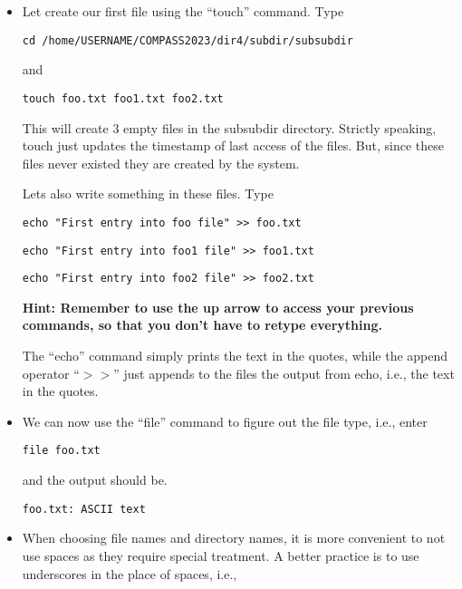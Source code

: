 \documentclass[aps,showpacs,prd,notitlepage,preprintnumbers,amsmath,amssymb,letterpaper]{revtex4}
\begin{document}
\begin{itemize}
\item Let create our first file using the ``touch'' command. Type

\begin{verbatim}
cd /home/USERNAME/COMPASS2023/dir4/subdir/subsubdir
\end{verbatim}

and

\begin{verbatim}
touch foo.txt foo1.txt foo2.txt
\end{verbatim}

This will create 3 empty files in the subsubdir directory. Strictly
speaking, touch just updates the timestamp of last access of the
files.  But, since these files never existed they are created by the
system.

Lets also write something in these files. Type

\begin{verbatim}
echo "First entry into foo file" >> foo.txt
\end{verbatim}

\begin{verbatim}
echo "First entry into foo1 file" >> foo1.txt
\end{verbatim}

\begin{verbatim}
echo "First entry into foo2 file" >> foo2.txt
\end{verbatim}

{\bf Hint: Remember to use the up arrow to access your previous
commands, so that you don't have to retype everything.}

The ``echo'' command simply prints the text in the quotes, while the
append operator ``$>>$'' just appends to the files the output from
echo, i.e., the text in the quotes.

\item We can now use the ``file'' command to figure out the file type, i.e.,
enter
  
\begin{verbatim}
file foo.txt
\end{verbatim}

and the output should be.
\begin{verbatim}
foo.txt: ASCII text
\end{verbatim}

\item When choosing file names and directory names, it is more
  convenient to not use spaces as they require special treatment. A
  better practice is to use underscores in the place of spaces, i.e.,


\end{itemize}
\end{document}
